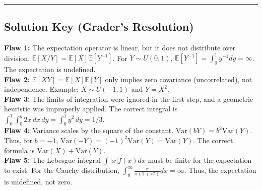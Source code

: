 \documentclass[11pt, a4paper]{article}
\theoremstyle{definition}
\theoremstyle{remark}
\newcommand{\E}{\mathbb{E}}
\newcommand{\Var}{\mathrm{Var}}
\begin{document}
\vspace{2em}
\hrule
\vspace{1em}
\subsection*{Solution Key (Grader's Resolution)}
\textbf{Flaw 1:} The expectation operator is linear, but it does not distribute over division. $\E[X/Y] = \E[X]\E[Y^{-1}]$. For $Y \sim U(0,1)$, $\E[Y^{-1}] = \int_0^1 y^{-1} dy = \infty$. The expectation is undefined. \\ \relax
\textbf{Flaw 2:} $\E[XY] = \E[X]\E[Y]$ only implies zero covariance (uncorrelated), not independence. Example: $X \sim U(-1,1)$ and $Y = X^2$. \\ \relax
\textbf{Flaw 3:} The limits of integration were ignored in the first step, and a geometric heuristic was improperly applied. The correct integral is $\int_0^1 \int_0^y 2x \, dx \, dy = \int_0^1 y^2 \, dy = 1/3$. \\ \relax
\textbf{Flaw 4:} Variance scales by the square of the constant. $\Var(bY) = b^2\Var(Y)$. Thus, for $b=-1$, $\Var(-Y) = (-1)^2\Var(Y) = \Var(Y)$. The correct formula is $\Var(X) + \Var(Y)$. \\ \relax
\textbf{Flaw 5:} The Lebesgue integral $\int |x| f(x) dx$ must be finite for the expectation to exist. For the Cauchy distribution, $\int_0^\infty \frac{x}{\pi(1+x^2)} dx = \infty$. Thus, the expectation is undefined, not zero.
\end{document}
